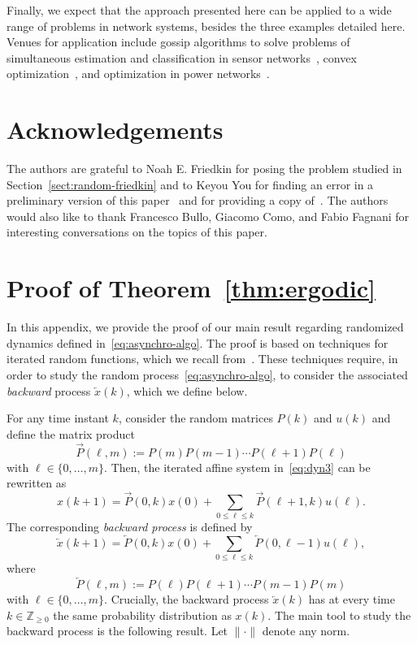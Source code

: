 \documentclass{IEEEtran}
\newcommand{\integernonnegative}{\mathbb{Z}_{\ge 0}}
\newcommand{\1}{\mathbf{1}} \newcommand{\ind}{\mathds{1}}
\begin{document}
Finally, we expect that the approach presented here can be applied to a wide range of problems in network systems, besides the three examples detailed here. Venues for application include gossip algorithms to solve problems of simultaneous estimation and classification in sensor networks~\cite{FF-SF-CR:11}, convex optimization~\cite{AN:11}, and optimization in power networks~\cite{SB-SZ:13}.



\section*{Acknowledgements}
The authors are grateful to Noah E. Friedkin for posing the problem studied in Section~\ref{sect:random-friedkin} and to Keyou You for finding an error in a preliminary version of this paper~\cite{CR-PF-RT-HI:13b} and for providing a copy of~\cite{KY-SS-LQ:14}. The authors would also like to thank Francesco Bullo, Giacomo Como, and Fabio Fagnani for interesting conversations on the topics of this paper. 


\appendices
\section{Proof of Theorem~\ref{thm:ergodic}}
\label{sec:proof}
In this appendix, we provide the proof of our main result regarding randomized dynamics defined in~\eqref{eq:asynchro-algo}. The proof is based on techniques for iterated random functions, which we recall from~\cite{PD-DF:99}. These techniques require, in order to study the random process~\eqref{eq:asynchro-algo}, to consider the associated {\em backward} process $\overleftarrow{x}(k)$, which we define below.

For any time instant $k$, consider the random matrices $P{(k)}$ and ${u}{(k)}$ and define the matrix product
\begin{equation}\label{P}
\overrightarrow{P}(\ell,m):=P{(m)}P{(m-1)}\cdots P{(\ell+1)}P{(\ell)}
\end{equation}
with $\ell\in\{0,\ldots,m\}.$
Then, the iterated affine system in~\eqref{eq:dyn3} can be rewritten as
\begin{equation}
 x(k+1)=\overrightarrow{P}(0,k)  x(0)+\sum_{0\leq \ell\leq k}\overrightarrow{P}(\ell+1,k)u(\ell).
\end{equation}
The corresponding \emph{backward process} is defined by
\begin{equation}
\overleftarrow{x}(k+1)=\overleftarrow{P}(0,k)  x(0)+\sum_{0\leq \ell\leq k}\overleftarrow{P}(0,\ell-1)u(\ell),
\end{equation}
where
\begin{equation}\label{Preverse}
\overleftarrow{P}(\ell,m):=P{(\ell)}P{(\ell+1)} \cdots P{(m-1)} P{(m)} 
\end{equation}
with $\ell\in\{0,\ldots,m\}.$
Crucially, the backward process $\overleftarrow{x}(k)$ has at every time $k\in\integernonnegative$ the same probability distribution as $x(k)$. 
The main tool to study the backward process is the following result. Let $\|\cdot\|$ denote any norm.
\end{document}
